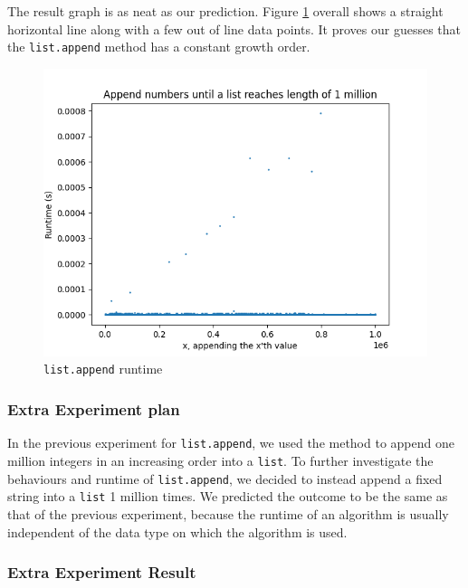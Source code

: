 \documentclass[titlepage, 12pt]{article}
\begin{document}
The result graph is as neat as our prediction. Figure \ref{fig:append} overall
shows a straight horizontal line along with a few out of line data points. It
proves our guesses that the \texttt{list.append} method has a constant growth
order.
\begin{figure}[H]
  \includegraphics[width=0.8\linewidth]{append.png}
  \centering
  \caption{\texttt{list.append} runtime}
  \label{fig:append}
\end{figure}

\subsubsection{Extra Experiment plan}

In the previous experiment for \texttt{list.append}, we used the method to
append one million integers in an increasing order into a \texttt{list}. To
further investigate the behaviours and runtime of \texttt{list.append}, we
decided to instead append a fixed string into a \texttt{list} 1 million times.
We predicted the outcome to be the same as that of the previous experiment,
because the runtime of an algorithm is usually independent of the data type
on which the algorithm is used.

\subsubsection{Extra Experiment Result}
\end{document}
